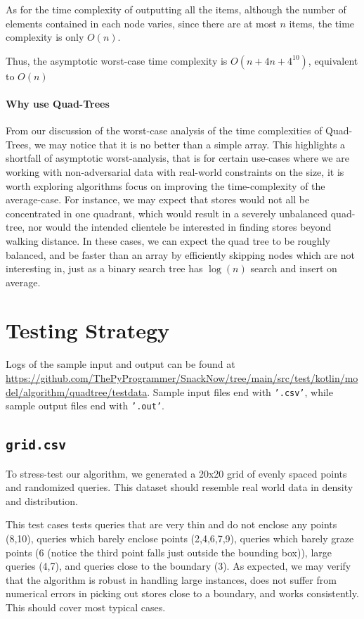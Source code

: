 \documentclass[12pt]{article}
\begin{document}
{As for the time complexity of outputting all the items, although the number of elements contained in each node varies, since there are at most $n$ items, the time complexity is only $O(n)$.


Thus, the asymptotic worst-case time complexity is $O(n + 4n + 4^{10})$, equivalent to $O(n)$

\paragraph{Why use Quad-Trees}

From our discussion of the worst-case analysis of the time complexities of Quad-Trees, we may notice that it is no better than a simple array. This highlights a shortfall of asymptotic worst-analysis, that is for certain use-cases where we are working with non-adversarial data with real-world constraints on the size, it is worth exploring algorithms focus on improving the time-complexity of the average-case. For instance, we may expect that stores would not all be concentrated in one quadrant, which would result in a severely unbalanced quad-tree, nor would the intended clientele be interested in finding stores beyond walking distance. In these cases, we can expect the quad tree to be roughly balanced, and be faster than an array by efficiently skipping nodes which are not interesting in, just as a binary search tree has $\log(n)$ search and insert on average.


\section{Testing Strategy}

Logs of the sample input and output can be found at \url{https://github.com/ThePyProgrammer/SnackNow/tree/main/src/test/kotlin/model/algorithm/quadtree/testdata}. Sample input files end with \texttt{'.csv'}, while sample output files end with \texttt{'.out'}.


\subsection{\texttt{grid.csv}}

To stress-test our algorithm, we generated a 20x20 grid of evenly spaced points and randomized queries. This dataset should resemble real world data in density and distribution.

This test cases tests queries that are very thin and do not enclose any points (8,10), queries which barely enclose points (2,4,6,7,9), queries which barely graze points (6 (notice the third point falls just outside the bounding box)), large queries (4,7), and queries close to the boundary (3). As expected, we may verify that the algorithm is robust in handling large instances, does not suffer from numerical errors in picking out stores close to a boundary, and works consistently. This should cover most typical cases.

}
\end{document}
